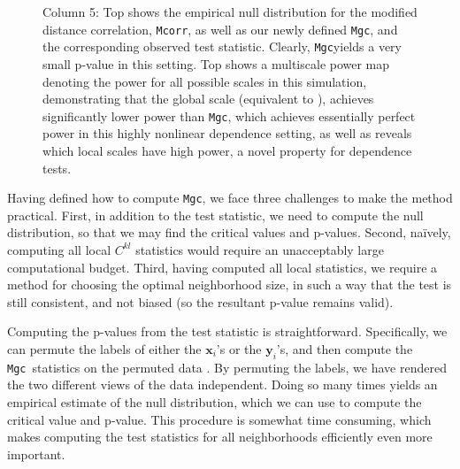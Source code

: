 \documentclass[11pt]{article}
\providecommand{\sct}[1]{{\sc \texttt{#1}}}
\providecommand{\mb}[1]{\boldsymbol{#1}}
\providecommand{\mc}[1]{\mathcal{#1}}
\newcommand{\G}{C}
\newcommand{\Mgc}{\sct{Mgc}}
\newcommand{\Mcorr}{\sct{Mcorr}}
\newcommand{\mbx}{\ensuremath{\mb{x}}}
\newcommand{\mby}{\ensuremath{\mb{y}}}
\begin{document}
\begin{figure}[htbp]
{Column 5: Top shows the empirical null distribution for the modified distance correlation, \Mcorr \cite{SzekelyRizzo2013a}, as well as our newly defined \Mgc, and the corresponding observed test statistic.  Clearly, \Mgc yields a very small p-value in this setting.
Top shows a multiscale power map denoting the power for all possible scales in this simulation, demonstrating that the global scale (equivalent to ), achieves significantly lower power than \Mgc, which achieves essentially perfect power in this highly nonlinear dependence setting, as well as reveals which local scales have high power, a novel property for dependence tests.
}
\label{f:schematic}
\end{figure}
%

Having defined how to compute \Mgc, we face three challenges to make the method practical. First, in addition to the test statistic, we need to compute the null distribution, so that we may find the critical values and p-values.
Second, na\"ively, computing all local $\G^{kl}$ statistics would require an unacceptably large computational budget.
Third, having computed all local statistics, we require a method for choosing the optimal neighborhood size, in such a way that the test is still consistent, and not biased (so the resultant p-value remains valid).

Computing the p-values from the test statistic is  straightforward.
Specifically, we can permute the labels of either the $\mbx_i$'s or the $\mby_i$'s, and then compute the \Mgc~statistics on the permuted data \cite{GoodPermutationBook}.  By permuting the labels, we have rendered the two different views of the data independent.  Doing so many times yields an empirical estimate of the null distribution, which we can use to compute the critical value and p-value. This procedure is somewhat time consuming, which makes computing the test statistics for all neighborhoods efficiently even more important.
\end{document}
